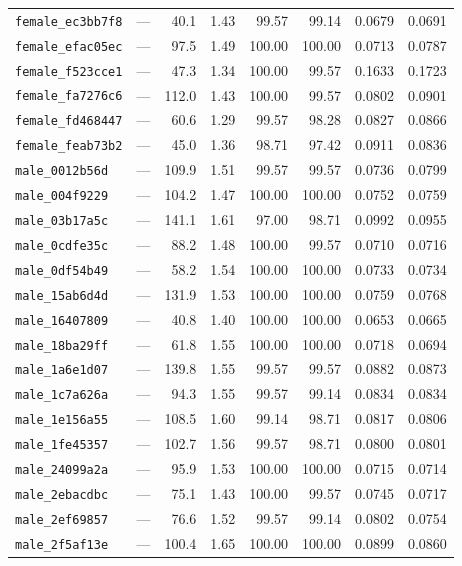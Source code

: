 \documentclass[11pt]{article}
\begin{document}
\begin{longtable}{lrrrrrrr}
\texttt{female\_ec3bb7f8} & --- & 40.1 & 1.43 & 99.57 & 99.14 & 0.0679 & 0.0691 \\
\texttt{female\_efac05ec} & --- & 97.5 & 1.49 & 100.00 & 100.00 & 0.0713 & 0.0787 \\
\texttt{female\_f523cce1} & --- & 47.3 & 1.34 & 100.00 & 99.57 & 0.1633 & 0.1723 \\
\texttt{female\_fa7276c6} & --- & 112.0 & 1.43 & 100.00 & 99.57 & 0.0802 & 0.0901 \\
\texttt{female\_fd468447} & --- & 60.6 & 1.29 & 99.57 & 98.28 & 0.0827 & 0.0866 \\
\texttt{female\_feab73b2} & --- & 45.0 & 1.36 & 98.71 & 97.42 & 0.0911 & 0.0836 \\
\texttt{male\_0012b56d} & --- & 109.9 & 1.51 & 99.57 & 99.57 & 0.0736 & 0.0799 \\
\texttt{male\_004f9229} & --- & 104.2 & 1.47 & 100.00 & 100.00 & 0.0752 & 0.0759 \\
\texttt{male\_03b17a5c} & --- & 141.1 & 1.61 & 97.00 & 98.71 & 0.0992 & 0.0955 \\
\texttt{male\_0cdfe35c} & --- & 88.2 & 1.48 & 100.00 & 99.57 & 0.0710 & 0.0716 \\
\texttt{male\_0df54b49} & --- & 58.2 & 1.54 & 100.00 & 100.00 & 0.0733 & 0.0734 \\
\texttt{male\_15ab6d4d} & --- & 131.9 & 1.53 & 100.00 & 100.00 & 0.0759 & 0.0768 \\
\texttt{male\_16407809} & --- & 40.8 & 1.40 & 100.00 & 100.00 & 0.0653 & 0.0665 \\
\texttt{male\_18ba29ff} & --- & 61.8 & 1.55 & 100.00 & 100.00 & 0.0718 & 0.0694 \\
\texttt{male\_1a6e1d07} & --- & 139.8 & 1.55 & 99.57 & 99.57 & 0.0882 & 0.0873 \\
\texttt{male\_1c7a626a} & --- & 94.3 & 1.55 & 99.57 & 99.14 & 0.0834 & 0.0834 \\
\texttt{male\_1e156a55} & --- & 108.5 & 1.60 & 99.14 & 98.71 & 0.0817 & 0.0806 \\
\texttt{male\_1fe45357} & --- & 102.7 & 1.56 & 99.57 & 98.71 & 0.0800 & 0.0801 \\
\texttt{male\_24099a2a} & --- & 95.9 & 1.53 & 100.00 & 100.00 & 0.0715 & 0.0714 \\
\texttt{male\_2ebacdbc} & --- & 75.1 & 1.43 & 100.00 & 99.57 & 0.0745 & 0.0717 \\
\texttt{male\_2ef69857} & --- & 76.6 & 1.52 & 99.57 & 99.14 & 0.0802 & 0.0754 \\
\texttt{male\_2f5af13e} & --- & 100.4 & 1.65 & 100.00 & 100.00 & 0.0899 & 0.0860 \\

\end{longtable}
\end{document}
